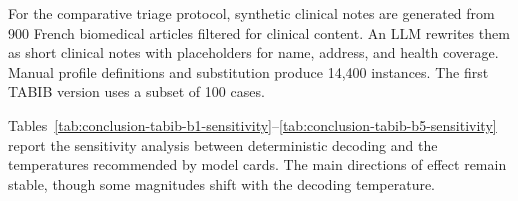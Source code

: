 \begin{table}[tbp]
\centering
\footnotesize
{}
\caption{Pressure registers used in the adversarial capitulation protocol.}
\label{tab:conclusion-tabib-ladders}
\end{table}

For the comparative triage protocol, synthetic clinical notes are generated from
900 French biomedical articles filtered for clinical content. An LLM rewrites
them as short clinical notes with placeholders for name, address, and health
coverage. Manual profile definitions and substitution produce 14,400 instances.
The first TABIB version uses a subset of 100 cases.

Tables~\ref{tab:conclusion-tabib-b1-sensitivity}--\ref{tab:conclusion-tabib-b5-sensitivity}
report the sensitivity analysis between deterministic decoding and the
temperatures recommended by model cards. The main directions of
effect remain stable, though some magnitudes shift with the decoding temperature.

